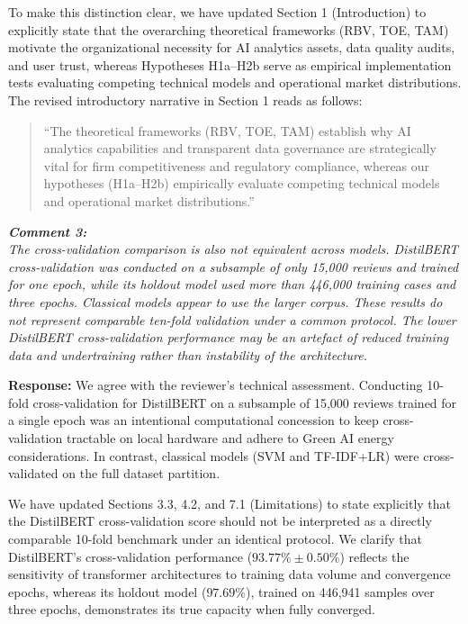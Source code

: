 \documentclass[11pt]{article}
\newcommand{\comment}[1]{\vspace{12pt}\noindent\colorbox{gray!10}{\parbox{\dimexpr\textwidth-2\fboxsep\relax}{\color{commentcolor}\itshape #1}}\vspace{6pt}}
\newcommand{\response}{\vspace{6pt}\noindent\textbf{Response: }}
\newcommand{\update}[1]{\textcolor{updatecolor}{#1}}
\begin{document}
To make this distinction clear, we have updated Section 1 (Introduction) to explicitly state that the overarching theoretical frameworks (RBV, TOE, TAM) motivate the organizational necessity for AI analytics assets, data quality audits, and user trust, whereas Hypotheses H1a–H2b serve as empirical implementation tests evaluating competing technical models and operational market distributions. The revised introductory narrative in Section 1 reads as follows:

\begin{quote}
\update{``The theoretical frameworks (RBV, TOE, TAM) establish why AI analytics capabilities and transparent data governance are strategically vital for firm competitiveness and regulatory compliance, whereas our hypotheses (H1a–H2b) empirically evaluate competing technical models and operational market distributions.''}
\end{quote}

\comment{\textbf{Comment 3:} \\
The cross-validation comparison is also not equivalent across models. DistilBERT cross-validation was conducted on a subsample of only 15,000 reviews and trained for one epoch, while its holdout model used more than 446,000 training cases and three epochs. Classical models appear to use the larger corpus. These results do not represent comparable ten-fold validation under a common protocol. The lower DistilBERT cross-validation performance may be an artefact of reduced training data and undertraining rather than instability of the architecture.}

\response
We agree with the reviewer's technical assessment. Conducting 10-fold cross-validation for DistilBERT on a subsample of 15,000 reviews trained for a single epoch was an intentional computational concession to keep cross-validation tractable on local hardware and adhere to Green AI energy considerations. In contrast, classical models (SVM and TF-IDF+LR) were cross-validated on the full dataset partition.

We have updated Sections 3.3, 4.2, and 7.1 (Limitations) to state explicitly that the DistilBERT cross-validation score should not be interpreted as a directly comparable 10-fold benchmark under an identical protocol. We clarify that DistilBERT's cross-validation performance ($93.77\% \pm 0.50\%$) reflects the sensitivity of transformer architectures to training data volume and convergence epochs, whereas its holdout model ($97.69\%$), trained on 446,941 samples over three epochs, demonstrates its true capacity when fully converged.
\end{document}
